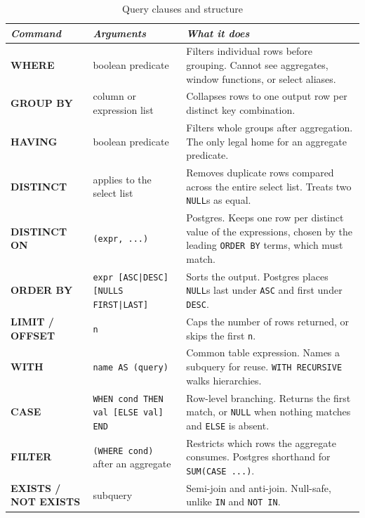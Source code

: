 \begin{table}[H]
\centering
\footnotesize
\renewcommand{\arraystretch}{1.4}
\begin{tabularx}{\textwidth}{>{\raggedright\arraybackslash}p{} >{\raggedright\arraybackslash}p{} >{\raggedright\arraybackslash}X}
\toprule
\textit{Command} & \textit{Arguments} & \textit{What it does} \\
\midrule
\textbf{WHERE} & boolean predicate & Filters individual rows before grouping. Cannot see aggregates, window functions, or select aliases. \\
\textbf{GROUP BY} & column or expression list & Collapses rows to one output row per distinct key combination. \\
\textbf{HAVING} & boolean predicate & Filters whole groups after aggregation. The only legal home for an aggregate predicate. \\
\textbf{DISTINCT} & applies to the select list & Removes duplicate rows compared across the entire select list. Treats two \texttt{NULL}s as equal. \\
\textbf{DISTINCT ON} & \texttt{(expr, ...)} & Postgres. Keeps one row per distinct value of the expressions, chosen by the leading \texttt{ORDER BY} terms, which must match. \\
\textbf{ORDER BY} & \texttt{expr [ASC|DESC] [NULLS FIRST|LAST]} & Sorts the output. Postgres places \texttt{NULL}s last under \texttt{ASC} and first under \texttt{DESC}. \\
\textbf{LIMIT / OFFSET} & \texttt{n} & Caps the number of rows returned, or skips the first \texttt{n}. \\
\textbf{WITH} & \texttt{name AS (query)} & Common table expression. Names a subquery for reuse. \texttt{WITH RECURSIVE} walks hierarchies. \\
\textbf{CASE} & \texttt{WHEN cond THEN val [ELSE val] END} & Row-level branching. Returns the first match, or \texttt{NULL} when nothing matches and \texttt{ELSE} is absent. \\
\textbf{FILTER} & \texttt{(WHERE cond)} after an aggregate & Restricts which rows the aggregate consumes. Postgres shorthand for \texttt{SUM(CASE ...)}. \\
\textbf{EXISTS / NOT EXISTS} & subquery & Semi-join and anti-join. Null-safe, unlike \texttt{IN} and \texttt{NOT IN}. \\
\bottomrule
\end{tabularx}
\caption*{Query clauses and structure}
\end{table}

\vspace{-2ex}
